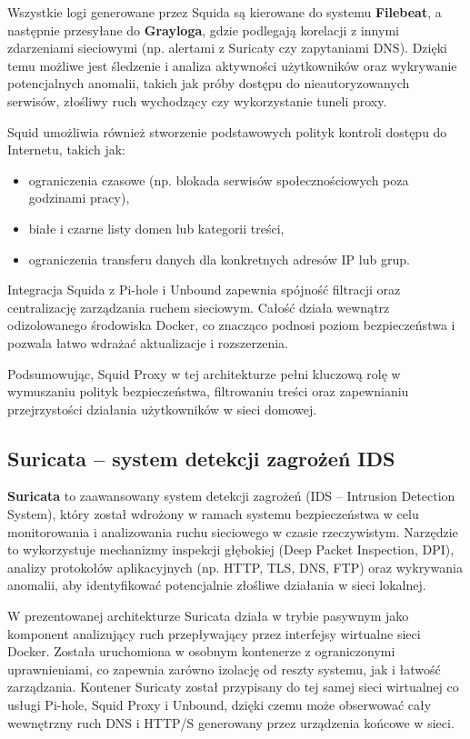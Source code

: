 \documentclass[
    left=2.5cm,         %
    right=2.5cm,        %
    top=2.5cm,          %
    bottom=3cm,         %
    bindingoffset=6mm,  %
    nohyphenation=true %
]{eiti/eiti-thesis} %
\begin{document}
Wszystkie logi generowane przez Squida są kierowane do systemu \textbf{Filebeat}, a następnie przesyłane do \textbf{Grayloga}, gdzie podlegają korelacji z innymi zdarzeniami sieciowymi (np. alertami z Suricaty czy zapytaniami DNS). Dzięki temu możliwe jest śledzenie i analiza aktywności użytkowników oraz wykrywanie potencjalnych anomalii, takich jak próby dostępu do nieautoryzowanych serwisów, złośliwy ruch wychodzący czy wykorzystanie tuneli proxy.

Squid umożliwia również stworzenie podstawowych polityk kontroli dostępu do Internetu, takich jak:
\begin{itemize}
    \item ograniczenia czasowe (np. blokada serwisów społecznościowych poza godzinami pracy),
    \item białe i czarne listy domen lub kategorii treści,
    \item ograniczenia transferu danych dla konkretnych adresów IP lub grup.
\end{itemize}

Integracja Squida z Pi-hole i Unbound zapewnia spójność filtracji oraz centralizację zarządzania ruchem sieciowym. Całość działa wewnątrz odizolowanego środowiska Docker, co znacząco podnosi poziom bezpieczeństwa i pozwala łatwo wdrażać aktualizacje i rozszerzenia.

Podsumowując, Squid Proxy w tej architekturze pełni kluczową rolę w wymuszaniu polityk bezpieczeństwa, filtrowaniu treści oraz zapewnianiu przejrzystości działania użytkowników w sieci domowej.

\subsection{Suricata – system detekcji zagrożeń IDS}

\textbf{Suricata}\cite{suricata-wiki} to zaawansowany system detekcji zagrożeń (IDS – Intrusion Detection System), który został wdrożony w ramach systemu bezpieczeństwa w celu monitorowania i analizowania ruchu sieciowego w czasie rzeczywistym. Narzędzie to wykorzystuje mechanizmy inspekcji głębokiej (Deep Packet Inspection, DPI), analizy protokołów aplikacyjnych (np. HTTP, TLS, DNS, FTP) oraz wykrywania anomalii, aby identyfikować potencjalnie złośliwe działania w sieci lokalnej\cite{suricata-docs}.

W prezentowanej architekturze Suricata działa w trybie pasywnym jako komponent analizujący ruch przepływający przez interfejsy wirtualne sieci Docker\cite{config-suricata}. Została uruchomiona w osobnym kontenerze z ograniczonymi uprawnieniami, co zapewnia zarówno izolację od reszty systemu, jak i łatwość zarządzania. Kontener Suricaty został przypisany do tej samej sieci wirtualnej co usługi Pi-hole, Squid Proxy i Unbound, dzięki czemu może obserwować cały wewnętrzny ruch DNS i HTTP/S generowany przez urządzenia końcowe w sieci\cite{suricata-docs}.
\end{document}
